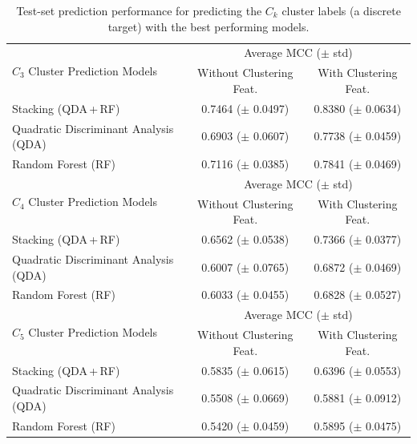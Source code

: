 \documentclass[sn-basic, Numbered]{sn-jnl} %
\begin{document}
\begin{table}[tb]
  \centering
  \caption{Test-set prediction performance for predicting the $C_k$ cluster labels (a discrete target) with the best performing models.}
  \label{tab:cluster-prediction}
  \begin{tabular}{lcc}
    \toprule
    \multirow[c]{2}{*}{$C_3$ Cluster Prediction Models} & \multicolumn{2}{c}{Average MCC ($\pm$ std)} \\
    \cmidrule(lr){2-3}
    & {Without Clustering Feat.} & {With Clustering Feat.} \\
    \midrule
    Stacking (QDA\,+\,RF)                 & 0.7464 ($\pm$ 0.0497) & 0.8380 ($\pm$ 0.0634) \\[0.4ex]
    Quadratic Discriminant Analysis (QDA)                     & 0.6903 ($\pm$ 0.0607) & 0.7738 ($\pm$ 0.0459) \\[0.4ex]
    Random Forest (RF)         & 0.7116 ($\pm$ 0.0385) & 0.7841 ($\pm$ 0.0469) \\[0.4ex]
    \midrule
    \multirow[c]{2}{*}{$C_4$ Cluster Prediction Models} & \multicolumn{2}{c}{Average MCC ($\pm$ std)} \\
    \cmidrule(lr){2-3}
    & {Without Clustering Feat.} & {With Clustering Feat.} \\
    \midrule
    Stacking (QDA\,+\,RF)                 & 0.6562 ($\pm$ 0.0538) & 0.7366 ($\pm$ 0.0377) \\[0.4ex]
    Quadratic Discriminant Analysis (QDA)                     & 0.6007 ($\pm$ 0.0765) & 0.6872 ($\pm$ 0.0469) \\[0.4ex]
    Random Forest (RF)         & 0.6033 ($\pm$ 0.0455) & 0.6828 ($\pm$ 0.0527) \\[0.4ex]
    \midrule
    \multirow[c]{2}{*}{$C_5$ Cluster Prediction Models} & \multicolumn{2}{c}{Average MCC ($\pm$ std)} \\
    \cmidrule(lr){2-3}
    & {Without Clustering Feat.} & {With Clustering Feat.} \\
    \midrule
    Stacking (QDA\,+\,RF)                 & 0.5835 ($\pm$ 0.0615) & 0.6396 ($\pm$ 0.0553) \\[0.4ex]
    Quadratic Discriminant Analysis (QDA)                      & 0.5508 ($\pm$ 0.0669) & 0.5881 ($\pm$ 0.0912) \\[0.4ex]
    Random Forest (RF)         & 0.5420 ($\pm$ 0.0459) & 0.5895 ($\pm$ 0.0475) \\
    \bottomrule
  \end{tabular}
\end{table}
\end{document}
